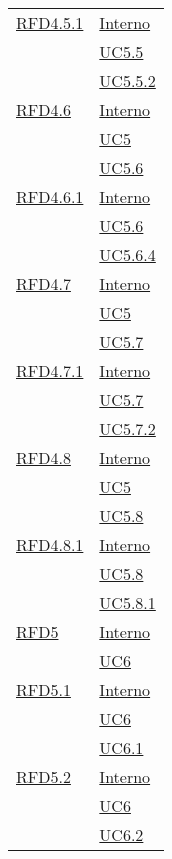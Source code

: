 \begin{longtable}{|>{\centering}m{5cm}|m{5cm}<{\centering}|}
\hyperlink{RFD4.5.1}{RFD4.5.1} & \hyperlink{Interno}{Interno}\\
& \hyperref[UC5.5]{UC5.5}\\
& \hyperref[UC5.5.2]{UC5.5.2}\\ \hline

\hyperlink{RFD4.6}{RFD4.6} & \hyperlink{Interno}{Interno}\\
& \hyperref[UC5]{UC5}\\
& \hyperref[UC5.6]{UC5.6}\\ \hline

\hyperlink{RFD4.6.1}{RFD4.6.1} & \hyperlink{Interno}{Interno}\\
& \hyperref[UC5.6]{UC5.6}\\
& \hyperref[UC5.6.4]{UC5.6.4}\\ \hline

\hyperlink{RFD4.7}{RFD4.7} & \hyperlink{Interno}{Interno}\\
& \hyperref[UC5]{UC5}\\
& \hyperref[UC5.7]{UC5.7}\\ \hline

\hyperlink{RFD4.7.1}{RFD4.7.1} & \hyperlink{Interno}{Interno}\\
& \hyperref[UC5.7]{UC5.7}\\
& \hyperref[UC5.7.2]{UC5.7.2}\\ \hline

\hyperlink{RFD4.8}{RFD4.8} & \hyperlink{Interno}{Interno}\\
& \hyperref[UC5]{UC5}\\
& \hyperref[UC5.8]{UC5.8}\\ \hline

\hyperlink{RFD4.8.1}{RFD4.8.1} & \hyperlink{Interno}{Interno}\\
& \hyperref[UC5.8]{UC5.8}\\
& \hyperref[UC5.8.1]{UC5.8.1}\\ \hline

\hyperlink{RFD5}{RFD5} & \hyperlink{Interno}{Interno}\\
& \hyperref[UC6]{UC6}\\ \hline

\hyperlink{RFD5.1}{RFD5.1} & \hyperlink{Interno}{Interno}\\
& \hyperref[UC6]{UC6}\\
& \hyperref[UC6.1]{UC6.1}\\ \hline

\hyperlink{RFD5.2}{RFD5.2} & \hyperlink{Interno}{Interno}\\
& \hyperref[UC6]{UC6}\\
& \hyperref[UC6.2]{UC6.2}\\ \hline


\end{longtable}
